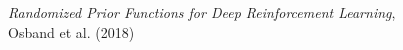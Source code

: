 \documentclass[preview]{standalone}
\begin{document}
\begin{center}
\textit{Randomized Prior Functions for Deep Reinforcement Learning},\\ Osband et al. (2018)
\end{center}
\end{document}
